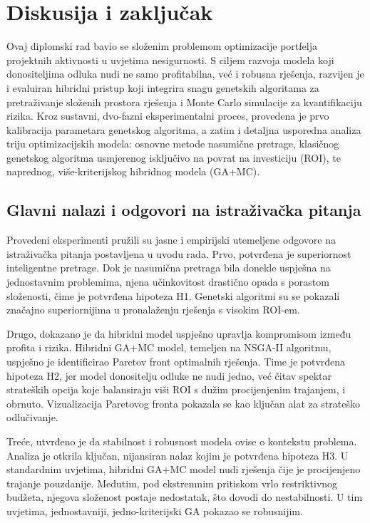 \section{Diskusija i zaključak}
\label{chap:zakljucak}

Ovaj diplomski rad bavio se složenim problemom optimizacije portfelja projektnih aktivnosti u uvjetima nesigurnosti. S ciljem razvoja modela koji donositeljima odluka nudi ne samo profitabilna, već i robusna rješenja, razvijen je i evaluiran hibridni pristup koji integrira snagu genetskih algoritama za pretraživanje složenih prostora rješenja i Monte Carlo simulacije za kvantifikaciju rizika. Kroz sustavni, dvo-fazni eksperimentalni proces, provedena je prvo kalibracija parametara genetskog algoritma, a zatim i detaljna usporedna analiza triju optimizacijskih modela: osnovne metode nasumične pretrage, klasičnog genetskog algoritma usmjerenog isključivo na povrat na investiciju (ROI), te naprednog, više-kriterijskog hibridnog modela (GA+MC).

\subsection{Glavni nalazi i odgovori na istraživačka pitanja}

Provedeni eksperimenti pružili su jasne i empirijski utemeljene odgovore na istraživačka pitanja postavljena u uvodu rada. Prvo, potvrđena je superiornost inteligentne pretrage. Dok je nasumična pretraga bila donekle uspješna na jednostavnim problemima, njena učinkovitost drastično opada s porastom složenosti, čime je potvrđena hipoteza H1. Genetski algoritmi su se pokazali značajno superiornijima u pronalaženju rješenja s visokim ROI-em.

Drugo, dokazano je da hibridni model uspješno upravlja kompromisom između profita i rizika. Hibridni GA+MC model, temeljen na NSGA-II algoritmu, uspješno je identificirao Paretov front optimalnih rješenja. Time je potvrđena hipoteza H2, jer model donositelju odluke ne nudi jedno, već čitav spektar strateških opcija koje balansiraju viši ROI s dužim procijenjenim trajanjem, i obrnuto. Vizualizacija Paretovog fronta pokazala se kao ključan alat za strateško odlučivanje.

Treće, utvrđeno je da stabilnost i robusnost modela ovise o kontekstu problema. Analiza je otkrila ključan, nijansiran nalaz kojim je potvrđena hipoteza H3. U standardnim uvjetima, hibridni GA+MC model nudi rješenja čije je procijenjeno trajanje pouzdanije. Međutim, pod ekstremnim pritiskom vrlo restriktivnog budžeta, njegova složenost postaje nedostatak, što dovodi do nestabilnosti. U tim uvjetima, jednostavniji, jedno-kriterijski GA pokazao se robusnijim.

